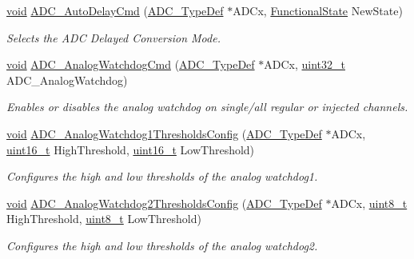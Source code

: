 \begin{DoxyCompactItemize}
\hyperlink{group___n_a_m_e_ga18028b8badbf1ea7e704ccac3c488e82}{void} \hyperlink{group___a_d_c___exported___constants_ga71b4bc4e08686bc8b1b8812a7a44422c}{A\-D\-C\-\_\-\-Auto\-Delay\-Cmd} (\hyperlink{struct_a_d_c___type_def}{A\-D\-C\-\_\-\-Type\-Def} $\ast$A\-D\-Cx, \hyperlink{group___exported__types_gac9a7e9a35d2513ec15c3b537aaa4fba1}{Functional\-State} New\-State)
\begin{DoxyCompactList}\small\item\em Selects the A\-D\-C Delayed Conversion Mode. \end{DoxyCompactList}\item 
\hyperlink{group___n_a_m_e_ga18028b8badbf1ea7e704ccac3c488e82}{void} \hyperlink{group___a_d_c___exported___constants_gad017d69bec6e497afd35ba25ea22d86e}{A\-D\-C\-\_\-\-Analog\-Watchdog\-Cmd} (\hyperlink{struct_a_d_c___type_def}{A\-D\-C\-\_\-\-Type\-Def} $\ast$A\-D\-Cx, \hyperlink{stdint_8h_a435d1572bf3f880d55459d9805097f62}{uint32\-\_\-t} A\-D\-C\-\_\-\-Analog\-Watchdog)
\begin{DoxyCompactList}\small\item\em Enables or disables the analog watchdog on single/all regular or injected channels. \end{DoxyCompactList}\item 
\hyperlink{group___n_a_m_e_ga18028b8badbf1ea7e704ccac3c488e82}{void} \hyperlink{group___a_d_c___exported___constants_gaa8866d19ed23ab2d536cdb19f1a203c3}{A\-D\-C\-\_\-\-Analog\-Watchdog1\-Thresholds\-Config} (\hyperlink{struct_a_d_c___type_def}{A\-D\-C\-\_\-\-Type\-Def} $\ast$A\-D\-Cx, \hyperlink{stdint_8h_a273cf69d639a59973b6019625df33e30}{uint16\-\_\-t} High\-Threshold, \hyperlink{stdint_8h_a273cf69d639a59973b6019625df33e30}{uint16\-\_\-t} Low\-Threshold)
\begin{DoxyCompactList}\small\item\em Configures the high and low thresholds of the analog watchdog1. \end{DoxyCompactList}\item 
\hyperlink{group___n_a_m_e_ga18028b8badbf1ea7e704ccac3c488e82}{void} \hyperlink{group___a_d_c___exported___constants_gad30b941c83a2f7400d3a8802b33d3bde}{A\-D\-C\-\_\-\-Analog\-Watchdog2\-Thresholds\-Config} (\hyperlink{struct_a_d_c___type_def}{A\-D\-C\-\_\-\-Type\-Def} $\ast$A\-D\-Cx, \hyperlink{stdint_8h_aba7bc1797add20fe3efdf37ced1182c5}{uint8\-\_\-t} High\-Threshold, \hyperlink{stdint_8h_aba7bc1797add20fe3efdf37ced1182c5}{uint8\-\_\-t} Low\-Threshold)
\begin{DoxyCompactList}\small\item\em Configures the high and low thresholds of the analog watchdog2. \end{DoxyCompactList}\item 

\end{DoxyCompactItemize}
